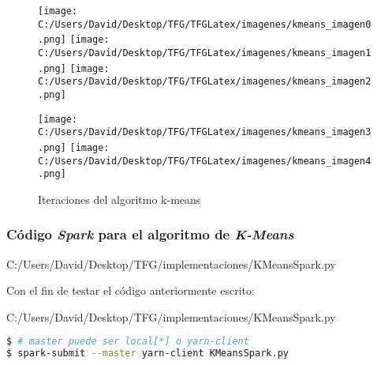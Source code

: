 \begin{figure}[htp]
  \centering
  \texttt{[image: C:/Users/David/Desktop/TFG/TFGLatex/imagenes/kmeans\_imagen0.png]}\quad
  \texttt{[image: C:/Users/David/Desktop/TFG/TFGLatex/imagenes/kmeans\_imagen1.png]}\quad
  \texttt{[image: C:/Users/David/Desktop/TFG/TFGLatex/imagenes/kmeans\_imagen2.png]}

  \medskip

  \texttt{[image: C:/Users/David/Desktop/TFG/TFGLatex/imagenes/kmeans\_imagen3.png]}\quad
  \texttt{[image: C:/Users/David/Desktop/TFG/TFGLatex/imagenes/kmeans\_imagen4.png]}

  \caption{Iteraciones del algoritmo k-means}
  \label{kmeans_iteraciones} %
\end{figure}

\newpage

\subsubsection*{Código \textit{Spark} para el algoritmo de \textit{K-Means}}


                {C:/Users/David/Desktop/TFG/implementaciones/KMeansSpark.py}

\clearpage
Con el fin de testar el código anteriormente escrito:


                {C:/Users/David/Desktop/TFG/implementaciones/KMeansSpark.py}

\begin{lstlisting}[language=bash, numbers=none]
$ # master puede ser local[*] o yarn-client
$ spark-submit --master yarn-client KMeansSpark.py
\end{lstlisting}

                

\newpage